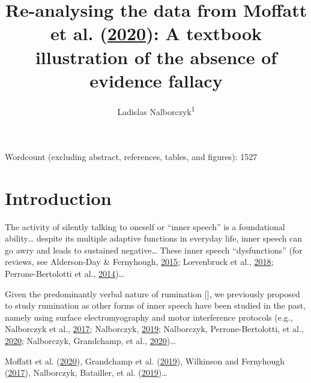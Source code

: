 \documentclass[
  english,
  man,floatsintext]{apa6}
\author{Ladislas Nalborczyk\textsuperscript{1}}
\affiliation{
\vspace{0.5cm}
\textsuperscript{1} Univ. Grenoble Alpes, CNRS, Grenoble INP, GIPSA-lab, 38000 Grenoble, France}
\title{Re-analysing the data from Moffatt et al. (\protect\hyperlink{ref-moffatt_inner_2020}{2020}): A textbook illustration of the absence of evidence fallacy}
\date{}
\begin{document}
\maketitle

Wordcount (excluding abstract, references, tables, and figures): 1527

\newpage

\hypertarget{introduction}{%
\section{Introduction}\label{introduction}}

The activity of silently talking to oneself or ``inner speech'' is a foundational ability\ldots{} despite its multiple adaptive functions in everyday life, inner speech can go awry and leads to sustained negative\ldots{} These inner speech ``dysfunctions'' (for reviews, see Alderson-Day \& Fernyhough, \protect\hyperlink{ref-alderson-day_inner_2015}{2015}; Lœvenbruck et al., \protect\hyperlink{ref-loevenbruck_cognitive_2018}{2018}; Perrone-Bertolotti et al., \protect\hyperlink{ref-perrone-bertolotti_what_2014}{2014})\ldots{}

Given the predominantly verbal nature of rumination {[}{]}, we previously proposed to study rumination as other forms of inner speech have been studied in the past, namely using surface electromyography and motor interference protocols (e.g., Nalborczyk et al., \protect\hyperlink{ref-nalborczyk_orofacial_2017}{2017}; Nalborczyk, \protect\hyperlink{ref-nalborczyk_understanding_2019}{2019}; Nalborczyk, Perrone-Bertolotti, et al., \protect\hyperlink{ref-nalborczyk_articulatory_2020}{2020}; Nalborczyk, Grandchamp, et al., \protect\hyperlink{ref-nalborczyk_can_2020}{2020})\ldots{}

Moffatt et al. (\protect\hyperlink{ref-moffatt_inner_2020}{2020}), Grandchamp et al. (\protect\hyperlink{ref-grandchamp_condialint_2019}{2019}), Wilkinson and Fernyhough (\protect\hyperlink{ref-wilkinson_auditory_2017}{2017}), Nalborczyk, Batailler, et al. (\protect\hyperlink{ref-nalborczyk_introduction_2019}{2019})\ldots{}
\end{document}
